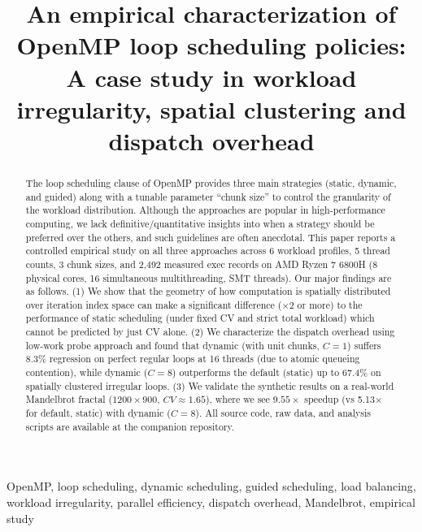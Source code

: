\documentclass[conference]{IEEEtran}
\begin{document}
\title{An empirical characterization of OpenMP loop scheduling policies: A case study in workload irregularity, spatial clustering and dispatch overhead}

\author{
}



\maketitle

\begin{abstract}
The loop scheduling clause of OpenMP provides three main strategies (static, dynamic, and guided) along with a tunable parameter ``chunk size'' to control the granularity of the workload distribution. Although the approaches are popular in high-performance computing, we lack definitive/quantitative insights into when a strategy should be preferred over the others, and such guidelines are often anecdotal. This paper reports a controlled empirical study on all three approaches across 6 workload profiles, 5 thread counts, 3 chunk sizes, and 2,492 measured exec records on AMD Ryzen 7 6800H (8 physical cores, 16 simultaneous multithreading, SMT threads). Our major findings are as follows. (1) We show that the geometry of how computation is spatially distributed over iteration index space can make a significant difference (\(\times 2\) or more) to the performance of static scheduling (under fixed CV and strict total workload) which cannot be predicted by just CV alone. (2) We characterize the dispatch overhead using low-work probe approach and found that dynamic (with unit chunks, \(C=1\)) suffers 8.3\% regression on perfect regular loops at 16 threads (due to atomic queueing contention), while dynamic (\(C=8\)) outperforms the default (static) up to 67.4\% on spatially clustered irregular loops. (3) We validate the synthetic results on a real-world Mandelbrot fractal (\(1200\times900\), \(CV\approx1.65\)), where we see \(9.55\times\) speedup (vs 5.13\(\times\) for default, static) with dynamic (\(C=8\)). All source code, raw data, and analysis scripts are available at the companion repository.
\end{abstract}

\begin{IEEEkeywords}
OpenMP, loop scheduling, dynamic scheduling, guided scheduling, load balancing, workload irregularity, parallel efficiency, dispatch overhead, Mandelbrot, empirical study
\end{IEEEkeywords}
\end{document}

